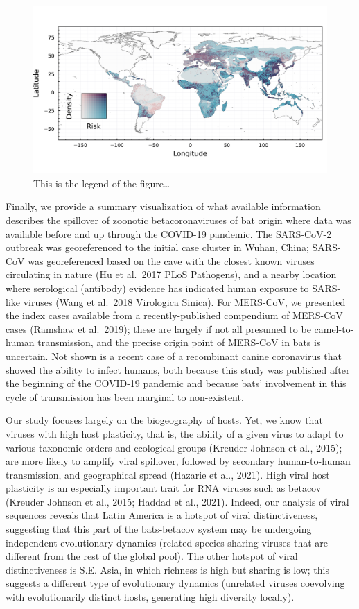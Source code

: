 \documentclass[10pt,oneside]{article}
\makeatletter
\def\maxwidth{\ifdim\Gin@nat@width>\linewidth\linewidth
\else\Gin@nat@width\fi}
\let\Oldincludegraphics\includegraphics
\renewcommand{\includegraphics}[1]{\Oldincludegraphics[width=\maxwidth]{#1}}
\makeatother
\begin{document}
\begin{figure}
\hypertarget{fig:compound}{%
\centering
\includegraphics{figures/risk_compounded.png}
\caption{This is the legend of the figure\ldots{}}\label{fig:compound}
}
\end{figure}

Finally, we provide a summary visualization of what available
information describes the spillover of zoonotic betacoronaviruses of bat
origin where data was available before and up through the COVID-19
pandemic. The SARS-CoV-2 outbreak was georeferenced to the initial case
cluster in Wuhan, China; SARS-CoV was georeferenced based on the cave
with the closest known viruses circulating in nature (Hu et al.~2017
PLoS Pathogens), and a nearby location where serological (antibody)
evidence has indicated human exposure to SARS-like viruses (Wang et
al.~2018 Virologica Sinica). For MERS-CoV, we presented the index cases
available from a recently-published compendium of MERS-CoV cases
(Ramshaw et al.~2019); these are largely if not all presumed to be
camel-to-human transmission, and the precise origin point of MERS-CoV in
bats is uncertain. Not shown is a recent case of a recombinant canine
coronavirus that showed the ability to infect humans, both because this
study was published after the beginning of the COVID-19 pandemic and
because bats' involvement in this cycle of transmission has been
marginal to non-existent.

Our study focuses largely on the biogeography of hosts. Yet, we know
that viruses with high host plasticity, that is, the ability of a given
virus to adapt to various taxonomic orders and ecological groups
(Kreuder Johnson et al., 2015); are more likely to amplify viral
spillover, followed by secondary human-to-human transmission, and
geographical spread (Hazarie et al., 2021). High viral host plasticity
is an especially important trait for RNA viruses such as betacov
(Kreuder Johnson et al., 2015; Haddad et al., 2021). Indeed, our
analysis of viral sequences reveals that Latin America is a hotspot of
viral distinctiveness, suggesting that this part of the bats-betacov
system may be undergoing independent evolutionary dynamics (related
species sharing viruses that are different from the rest of the global
pool). The other hotspot of viral distinctiveness is S.E. Asia, in which
richness is high but sharing is low; this suggests a different type of
evolutionary dynamics (unrelated viruses coevolving with evolutionarily
distinct hosts, generating high diversity locally).
\end{document}
